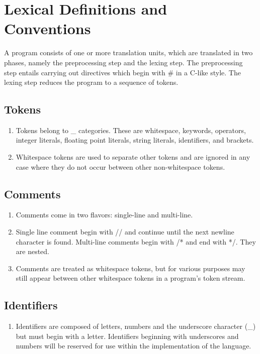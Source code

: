 \section{Lexical Definitions and Conventions}
A program consists of one or more translation units, which are translated in two phases, namely the preprocessing step and the lexing step. The preprocessing step entails carrying out directives which begin with \# in a C-like style. The lexing step reduces the program to a sequence of tokens.

\subsection{Tokens}
\begin{enumerate}
	\item Tokens belong to _ categories. These are whitespace, keywords, operators, integer literals, floating point literals, string literals, identifiers, and brackets.
	\item Whitespace tokens are used to separate other tokens and are ignored in any case where they do not occur between other non-whitespace tokens.
\end{enumerate}

\subsection{Comments}
\begin{enumerate}
	\item Comments come in two flavors: single-line and multi-line.
	\item Single line comment begin with // and continue until the next newline character is found. Multi-line comments begin with /* and end with */. They are nested.
	\item Comments are treated as whitespace tokens, but for various purposes may still appear between other whitespace tokens in a program's token stream.
\end{enumerate}

\subsection{Identifiers}
\begin{enumerate}
	\item Identifiers are composed of letters, numbers and the underscore character (_) but must begin with a letter. Identifiers beginning with underscores and numbers will be reserved for use within the implementation of the language.
\end{enumerate}

